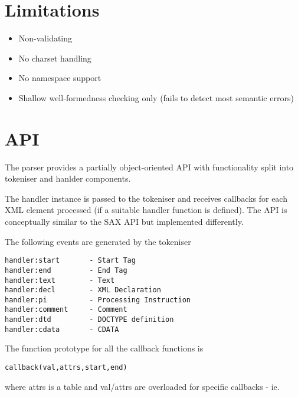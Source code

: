 \documentclass{ltxdoc}
\begin{document}
\section{Limitations}

\begin{itemize}
\item
  Non-validating
\item
  No charset handling
\item
  No namespace support
\item
  Shallow well-formedness checking only (fails to detect most semantic
  errors)
\end{itemize}
\section{API}

The parser provides a partially object-oriented API with functionality
split into tokeniser and hanlder components.

The handler instance is passed to the tokeniser and receives callbacks
for each XML element processed (if a suitable handler function is
defined). The API is conceptually similar to the SAX API but implemented
differently.

The following events are generated by the tokeniser

\begin{verbatim}
handler:start       - Start Tag
handler:end         - End Tag
handler:text        - Text
handler:decl        - XML Declaration
handler:pi          - Processing Instruction
handler:comment     - Comment
handler:dtd         - DOCTYPE definition
handler:cdata       - CDATA 
\end{verbatim}
The function prototype for all the callback functions is

\begin{verbatim}
callback(val,attrs,start,end)
\end{verbatim}
where attrs is a table and val/attrs are overloaded for specific
callbacks - ie.
\end{document}
